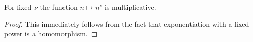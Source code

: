 \begin{theorem}
\label{isMultiplicative_powR}
\leanok
For fixed $\nu$ the function $n\mapsto n^\nu$ is multiplicative.
\end{theorem}
\begin{proof}
\leanok
This immediately follows from the fact that exponentiation with a fixed power is a homomorphism.
\end{proof}
